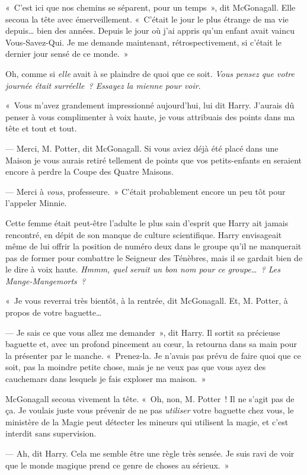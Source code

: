 «~C'est ici que nos chemins se séparent, pour un temps~», dit McGonagall. Elle secoua la tête avec émerveillement.
«~C'était le jour le plus étrange de ma vie depuis… bien des années.
Depuis le jour où j'ai appris qu'un enfant avait vaincu Vous-Savez-Qui.
Je me demande maintenant, rétrospectivement, si c'était le dernier jour sensé de ce monde.~»

Oh, comme si \emph{elle} avait à se plaindre de quoi que ce soit. \emph{Vous pensez que votre journée était surréelle~? Essayez la mienne pour voir}.

«~Vous m'avez grandement impressionné aujourd'hui, lui dit Harry. J'aurais dû penser à vous complimenter à voix haute, je vous attribuais des points dans ma tête et tout et tout.

--- Merci, M. Potter, dit McGonagall. Si vous aviez déjà été placé dans une Maison je vous aurais retiré tellement de points que vos petits-enfants en seraient encore à perdre la Coupe des Quatre Maisons.

--- Merci à \emph{vous}, professeure.~» C'était probablement encore un peu tôt pour l'appeler Minnie.

Cette femme était peut-être l'adulte le plus sain d'esprit que Harry ait jamais rencontré, en dépit de son manque de culture scientifique.
Harry envisageait même de lui offrir la position de numéro deux dans le groupe qu'il ne manquerait pas de former pour combattre le Seigneur des Ténèbres, mais il se gardait bien de le dire à voix haute.
\emph{Hmmm, quel serait un bon nom pour ce groupe…~? Les Mange-Mangemorts~?}

«~Je vous reverrai très bientôt, à la rentrée, dit McGonagall. Et, M. Potter, à propos de votre baguette…

--- Je sais ce que vous allez me demander~», dit Harry.
Il sortit sa précieuse baguette et, avec un profond pincement au cœur, la retourna dans sa main pour la présenter par le manche.
«~Prenez-la. Je n'avais pas prévu de faire quoi que ce soit, pas la moindre petite chose, mais je ne veux pas que vous ayez des cauchemars dans lesquels je fais exploser ma maison.~»

McGonagall secoua vivement la tête. «~Oh, non, M. Potter~! Il ne s'agit pas de ça.
Je voulais juste vous prévenir de ne pas \emph{utiliser} votre baguette chez vous, le ministère de la Magie peut détecter les mineurs qui utilisent la magie, et c'est interdit sans supervision.

--- Ah, dit Harry. Cela me semble être une règle très sensée. Je suis ravi de voir que le monde magique prend ce genre de choses au sérieux.~»

